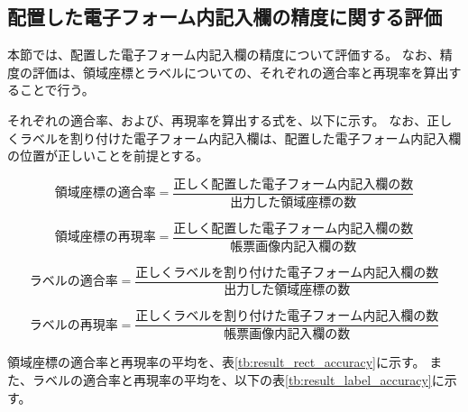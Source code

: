



\subsection{配置した電子フォーム内記入欄の精度に関する評価}\label{subsec:evalue_accuracy}
本節では、配置した電子フォーム内記入欄の精度について評価する。
なお、精度の評価は、領域座標とラベルについての、それぞれの適合率と再現率を算出することで行う。

それぞれの適合率、および、再現率を算出する式を、以下に示す。
なお、正しくラベルを割り付けた電子フォーム内記入欄は、配置した電子フォーム内記入欄の位置が正しいことを前提とする。

\begin{equation}\label{eq:area_precision}
    領域座標の適合率=\frac{正しく配置した電子フォーム内記入欄の数}{出力した領域座標の数}
\end{equation}

\begin{equation}\label{eq:area_recall}
    領域座標の再現率=\frac{正しく配置した電子フォーム内記入欄の数}{帳票画像内記入欄の数}
\end{equation}

\begin{equation}\label{eq:label_precision}
    ラベルの適合率=\frac{正しくラベルを割り付けた電子フォーム内記入欄の数}{出力した領域座標の数}
\end{equation}

\begin{equation}\label{eq:label_recall}
    ラベルの再現率=\frac{正しくラベルを割り付けた電子フォーム内記入欄の数}{帳票画像内記入欄の数}
\end{equation}

領域座標の適合率と再現率の平均を、表\ref{tb:result_rect_accuracy}に示す。
また、ラベルの適合率と再現率の平均を、以下の表\ref{tb:result_label_accuracy}に示す。

